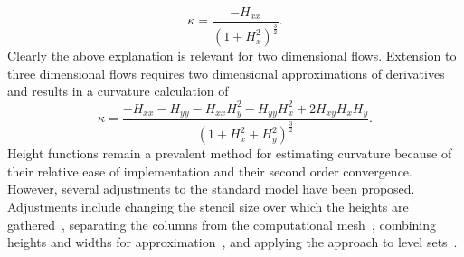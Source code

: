 \begin{equation}
\kappa = \frac{-H_{xx}}{(1+H_{x}^{2})^{\frac{3}{2}}}.
\label{eqn:kap}
\end{equation}
Clearly the above explanation is relevant for two dimensional flows. Extension to three dimensional flows requires two dimensional approximations of derivatives and results in a curvature calculation of 
\begin{equation}
\kappa = \frac{-H_{xx}-H_{yy}-H_{xx}H_y^2-H_{yy}H_x^2+2H_{xy}H_xH_y}{(1+H_{x}^{2}+H_{y}^{2})^{\frac{3}{2}}}.
\label{eqn:kap3D}
\end{equation}
Height functions remain a prevalent method for estimating curvature because of their relative ease of implementation and their second order convergence. However, several adjustments to the standard model have been proposed. Adjustments include changing the stencil size over which the heights are gathered~\cite{Sussman2007, Sussman2003}, separating the columns from the computational mesh~\cite{Owkes2015}, combining heights and widths for approximation~\cite{Popinet2009}, and applying the approach to level sets~\cite{Owkes2013}.